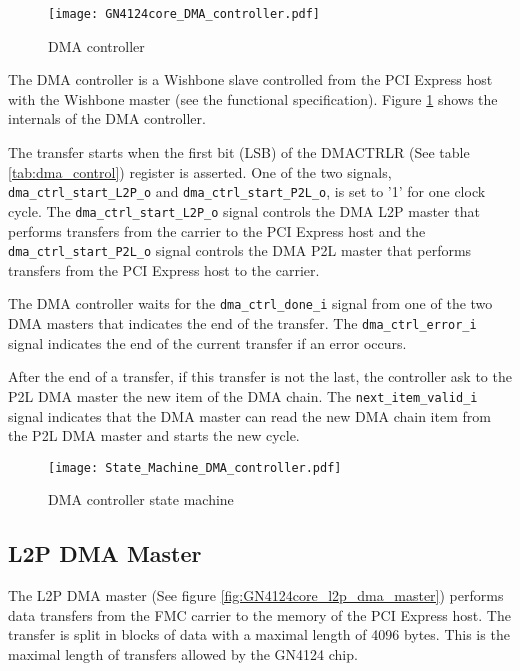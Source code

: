\documentclass[10pt,a4paper]{cerndoc}
\begin{document}
\begin{figure}[!ht]
  \centering
  \texttt{[image: GN4124core\_DMA\_controller.pdf]}
  \caption{DMA controller}
  \label{fig:GN4124core_dma_ctrl}
\end{figure}
  
The DMA controller is a Wishbone slave controlled from the PCI Express host with the Wishbone master (see the functional specification). Figure \ref{fig:GN4124core_dma_ctrl} shows the internals of the DMA controller.

The transfer starts when the first bit (LSB) of the DMACTRLR (See table  \ref{tab:dma_control}) register is asserted. One of the two signals, \verb+dma_ctrl_start_L2P_o+ and \verb+dma_ctrl_start_P2L_o+, is set to '1' for one clock cycle. The \verb+dma_ctrl_start_L2P_o+ signal controls the DMA L2P master that performs transfers from the carrier to the PCI Express host and the \verb+dma_ctrl_start_P2L_o+ signal controls the DMA P2L master that performs transfers from the PCI Express host to the carrier.

The DMA controller waits for the \verb+dma_ctrl_done_i+ signal from one of the two DMA masters that indicates the end of the transfer. The \verb+dma_ctrl_error_i+ signal indicates the end of the current transfer if an error occurs.

After the end of a transfer, if this transfer is not the last, the controller ask to the P2L DMA master the new item of the DMA chain. The \verb+next_item_valid_i+ signal indicates that the DMA master can read the new DMA chain item from the P2L DMA master and starts the new cycle.




\begin{figure}[!ht]
	\centering
		\texttt{[image: State\_Machine\_DMA\_controller.pdf]}
	\caption{DMA controller state machine}
	\label{fig:GN4124core_dma_ctrl_state_machine}
\end{figure}



  \subsection{L2P DMA Master}
The L2P DMA master (See figure \ref{fig:GN4124core_l2p_dma_master}) performs data transfers from the FMC carrier to the memory of the PCI Express host. The transfer is split in blocks of data with a maximal length of 4096 bytes. This is the maximal length of transfers allowed by the GN4124 chip.
\end{document}
